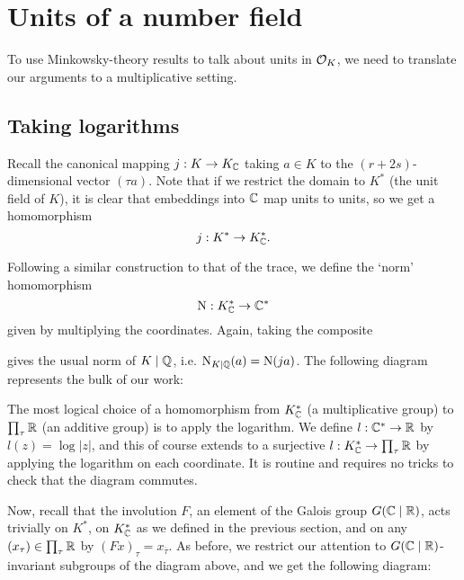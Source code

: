 \section{Units of a number field}

To use Minkowsky-theory results to talk about units in $\mathcal{O}_K$, we need to translate our arguments to a multiplicative setting.

\subsection{Taking logarithms}

Recall the canonical mapping $j:K\to K_{\mathbb{C}}$ taking $a\in K$ to the $(r+2s)$-dimensional vector $(\tau a)$. Note that if we restrict the domain to $K^*$ (the unit field of $K$), it is clear that embeddings into $\mathbb{C}$ map units to units, so we get a homomorphism
\[
	j : K^* \to K^*_{\mathbb{C}}.
\]

Following a similar construction to that of the trace, we define the `norm' homomorphism
\[
	\operatorname{N} : K^*_{\mathbb{C}} \to \mathbb{C}^*
\]
given by multiplying the coordinates. Again, taking the composite
\begin{center}
\end{center}
gives the usual norm of $K\mid\mathbb{Q}$, i.e. $\operatorname{N}_{K\mid\mathbb{Q}}(a)=\operatorname{N}(ja)$. The following diagram represents the bulk of our work:
\begin{center}
\end{center}

The most logical choice of a homomorphism from $K^*_{\mathbb{C}}$ (a multiplicative group) to $\prod_\tau\mathbb{R}$ (an additive group) is to apply the logarithm. We define $l:\mathbb{C}^*\to\mathbb{R}$ by $l(z)=\log|z|$, and this of course extends to a surjective $l:K^*_{\mathbb{C}}\to\prod_\tau\mathbb{R}$ by applying the logarithm on each coordinate. It is routine and requires no tricks to check that the diagram commutes.

Now, recall that the involution $F$, an element of the Galois group $G(\mathbb{C}\mid\mathbb{R})$, acts trivially on $K^*$, on $K^*_{\mathbb{C}}$ as we defined in the previous section, and on any $(x_\tau)\in\prod_\tau\mathbb{R}$ by $(Fx)_\tau = x_{\overline{\tau}}$. As before, we restrict our attention to $G(\mathbb{C}\mid\mathbb{R})$-invariant subgroups of the diagram above, and we get the following diagram:

